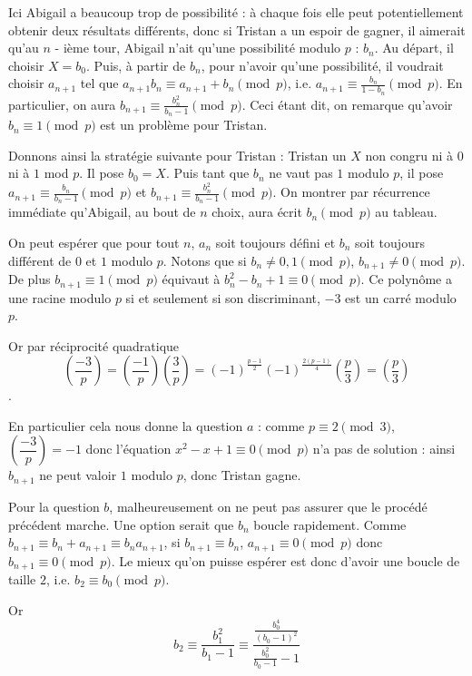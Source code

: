 \begin{sol}
Ici Abigail a beaucoup trop de possibilité : à chaque fois elle peut potentiellement obtenir deux résultats différents, donc si Tristan a un espoir de gagner, il aimerait qu'au $n$ - ième tour, Abigail n'ait qu'une possibilité modulo $p$ : $b_n$. Au départ, il choisir $X=b_0$. Puis, à partir de $b_n$, pour n'avoir qu'une possibilité, il voudrait choisir $a_{n + 1}$ tel que $a_{n + 1}b_n\equiv a_{n + 1} + b_n\pmod{p}$, i.e. $a_{n + 1}\equiv \frac{b_n}{1 - b_n}\pmod{p}$. En particulier, on aura $b_{n + 1}\equiv \frac{b_n^2}{b_n - 1}\pmod{p}$. Ceci étant dit, on remarque qu'avoir $b_n\equiv 1\pmod{p}$ est un problème pour Tristan.

Donnons ainsi la stratégie suivante pour Tristan : Tristan un $X$ non congru ni à $0$ ni à $1$ mod $p$. Il pose $b_0=X$. Puis tant que $b_n$ ne vaut pas $1$ modulo $p$, il pose $a_{n + 1}\equiv \frac{b_n}{b_n - 1}\pmod{p}$ et $b_{n + 1}\equiv \frac{b_n^2}{b_n - 1}\pmod{p} $. On montrer par récurrence immédiate qu'Abigail, au bout de $n$ choix, aura écrit $b_n\pmod{p}$ au tableau.

On peut espérer que pour tout $n$, $a_n$ soit toujours défini et $b_n$ soit toujours différent de $0$ et $1$ modulo $p$. Notons que si $b_n\neq 0,1\pmod{p}$, $b_{n + 1} \neq 0 \pmod{p}$. De plus $b_{n + 1}\equiv 1 \pmod{p}$ équivaut à $b_n^2 - b_n + 1\equiv 0\pmod{p}$. Ce polynôme a une racine modulo $p$ si et seulement si son discriminant, $-3$ est un carré modulo $p$.

Or par réciprocité quadratique $$\left(\dfrac{-3}{p}\right)=\left(\dfrac{-1}{p}\right)\left(\dfrac{3}{p}\right)=(-1)^{\frac{p-1}{2}}(-1)^{\frac{2(p-1)}{4}}\left(\dfrac{p}{3}\right)=\left(\dfrac{p}{3}\right)$$.

En particulier cela nous donne la question $a$ : comme $p\equiv 2 \pmod{3}$, $\left(\dfrac{-3}{p}\right)=-1$ donc l'équation $x^2-x + 1\equiv 0\pmod{p}$ n'a pas de solution : ainsi $b_{n + 1}$ ne peut valoir $1$ modulo $p$, donc Tristan gagne.

Pour la question $b$, malheureusement on ne peut pas assurer que le procédé précédent marche. Une option serait que $b_n$ boucle rapidement. Comme $b_{n + 1}\equiv b_n + a_{n + 1}\equiv b_na_{n + 1}$, si $b_{n + 1}\equiv b_n$, $a_{n + 1}\equiv 0 \pmod{p}$ donc $b_{n + 1}\equiv 0\pmod{p}$. Le mieux qu'on puisse espérer est donc d'avoir une boucle de taille $2$, i.e. $b_2\equiv b_0\pmod{p}$.

Or $$b_{2}\equiv \frac{b_1^2}{b_1 - 1}\equiv \frac{\frac{b_0^4}{(b_0 - 1)^2}}{\frac{b_0^2}{b_0 - 1} - 1}$$


\end{sol}
